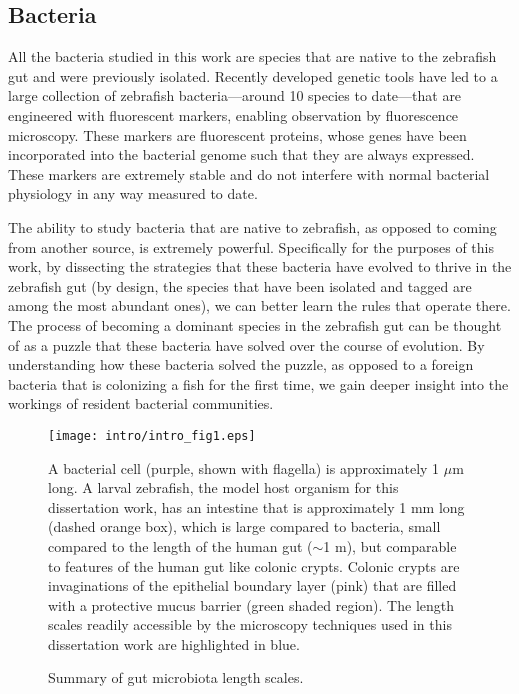 \subsection{Bacteria}
All the bacteria studied in this work are species that are native to the zebrafish gut and were previously isolated. Recently developed genetic tools \cite{wiles_modernized_2018} have led to a large collection of zebrafish bacteria---around 10 species to date---that are engineered with fluorescent markers, enabling observation by fluorescence microscopy. These markers are fluorescent proteins, whose genes have been incorporated into the bacterial genome such that they are always expressed. These markers are extremely stable and do not interfere with normal bacterial physiology in any way measured to date. 

The ability to study bacteria that are native to zebrafish, as opposed to coming from another source, is extremely powerful. Specifically for the purposes of this work, by dissecting the strategies that these bacteria have evolved to thrive in the zebrafish gut (by design, the species that have been isolated and tagged are among the most abundant ones), we can better learn the rules that operate there. The process of becoming a dominant species in the zebrafish gut can be thought of as a puzzle that these bacteria have solved over the course of evolution. By understanding how these bacteria solved the puzzle, as opposed to a foreign bacteria that is colonizing a fish for the first time, we gain deeper insight into the workings of resident bacterial communities.

\begin{figure}%
	\centerline{
		\texttt{[image: intro/intro\_fig1.eps]}}
	\caption{Summary of gut microbiota length scales.} {A bacterial cell (purple, shown with flagella) is approximately 1 $\mu$m long. A larval zebrafish, the model host organism for this dissertation work, has an intestine that is approximately 1 mm long (dashed orange box), which is large compared to bacteria, small compared to the length of the human gut ($\sim$1 m), but comparable to features of the human gut like colonic crypts. Colonic crypts are invaginations of the epithelial boundary layer (pink) that are filled with a protective mucus barrier (green shaded region). The length scales readily accessible by the microscopy techniques used in this dissertation work are highlighted in blue.}
\end{figure}


